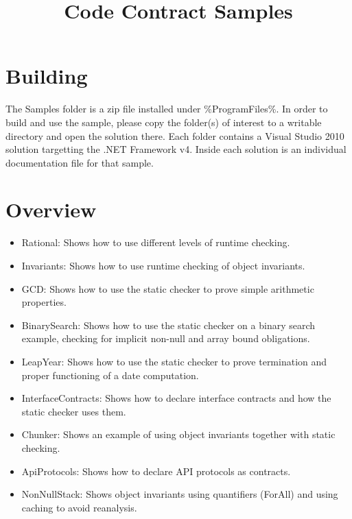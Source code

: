\documentclass{article}
\title{Code Contract Samples}
\begin{document}
\maketitle
\section{Building}
The Samples folder is a zip file installed under \%ProgramFiles\%. In
order to build and use the sample, please copy the folder(s) of
interest to a writable directory and open the solution there.
Each folder contains a Visual Studio 2010 solution targetting the .NET
Framework v4.
Inside each solution is an individual documentation file for that sample.

\section{Overview}
\begin{itemize}
  \item Rational: Shows how to use different levels of runtime
    checking.
\item Invariants: Shows how to use runtime checking of object
  invariants.

\item GCD: Shows how to use the static checker to prove simple
  arithmetic properties.

\item BinarySearch: Shows how to use the static checker on a binary
  search example, checking for implicit non-null and array bound
  obligations.

\item LeapYear: Shows how to use the static checker to prove
  termination and proper functioning of a date computation.

\item InterfaceContracts: Shows how to declare interface contracts and
  how the static checker uses them.

\item Chunker: Shows an example of using object invariants together
  with static checking.

\item ApiProtocols: Shows how to declare API protocols as contracts.

\item NonNullStack: Shows object invariants using quantifiers (ForAll)
and using caching to avoid reanalysis.

 
\end{itemize}
\end{document}
